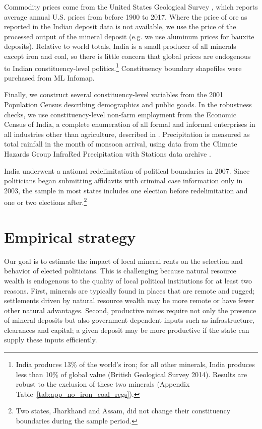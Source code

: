 \documentclass[12pt,letterpaper]{article}
\begin{document}
Commodity prices come from the United States Geological Survey
\cite{Kelly2013}, which reports average annual U.S. prices from before
1900 to 2017. Where the price of ore as reported in the Indian deposit
data is not available, we use the price of the processed output of the
mineral deposit (e.g. we use aluminum prices for bauxite deposits).
Relative to world totals, India is a small producer of all minerals
except iron and coal, so there is little concern that global prices
are endogenous to Indian constituency-level politics.\footnote{India
  produces 13\% of the world's iron; for all other minerals, India
  produces less than 10\% of global value (British Geological Survey
  2014). Results are robust to the exclusion of these two minerals
  (Appendix Table~\ref{tab:app_no_iron_coal_regs}).}  Constituency
boundary shapefiles were purchased from ML Infomap.

Finally, we construct several constituency-level variables from the
2001 Population Census describing demographics and public goods. In
the robustness checks, we use constituency-level non-farm employment
from the Economic Census of India, a complete enumeration of all
formal and informal enterprises in all industries other than
agriculture, described in . Precipitation is
measured as total rainfall in the month of monsoon arrival, using data
from the Climate Hazards Group InfraRed Precipitation with Stations
data archive \cite{Chirps2014}.

India underwent a national redelimitation of political boundaries in
2007. Since politicians began submitting affidavits with criminal case
information only in 2003, the sample in most states includes one
election before redelimitation and one or two elections after.\footnote{Two
  states, Jharkhand and Assam, did not change their constituency
  boundaries during the sample period.}

\section{Empirical strategy}
\label{sec:strat}

Our goal is to estimate the impact of local mineral rents on the
selection and behavior of elected politicians.  This is challenging
because natural resource wealth is endogenous to the quality of local
political institutions for at least two reasons. First, minerals are
typically found in places that are remote and rugged; settlements
driven by natural resource wealth may be more remote or have fewer
other natural advantages. Second, productive mines require not only
the presence of mineral deposits but also government-dependent inputs
such as infrastructure, clearances and capital; a given deposit may be
more productive if the state can supply these inputs efficiently.
\end{document}
